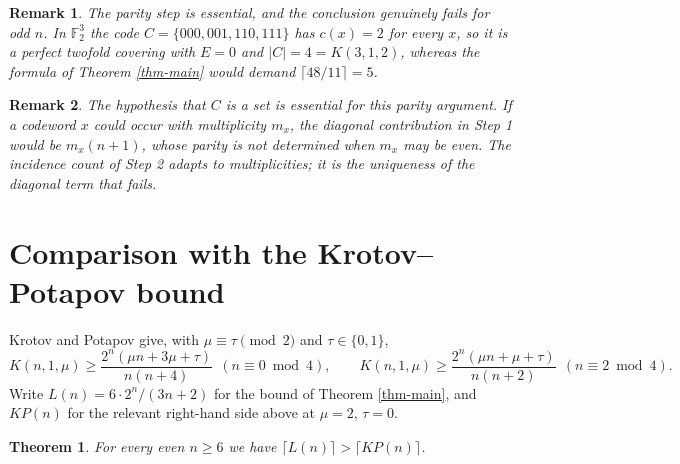 \documentclass[10pt,a4paper]{article}
\newtheorem{theorem}{Theorem}[section]
\newtheorem{remark}{Remark}[section]
\begin{document}
\begin{remark}\label{rem-parity}
The parity step is essential, and the conclusion genuinely fails for odd $n$.
In $\mathbb{F}_2^3$ the code $C=\{000,001,110,111\}$ has $c(x)=2$ for every $x$,
so it is a perfect twofold covering with $E=0$ and $|C|=4=K(3,1,2)$, whereas the
formula of Theorem \ref{thm-main} would demand $\lceil 48/11\rceil=5$.
\end{remark}

\begin{remark}\label{rem-set}
The hypothesis that $C$ is a set is essential for this parity argument. If a
codeword $x$ could occur with multiplicity $m_x$, the diagonal contribution in
Step 1 would be $m_x(n+1)$, whose parity is not determined when $m_x$ may be
even. The incidence count of Step 2 adapts to multiplicities; it is the
uniqueness of the diagonal term that fails.
\end{remark}

\section{Comparison with the Krotov--Potapov bound}\label{sec-dominance}

Krotov and Potapov \cite[Theorem 6]{KP-2021} give, with $\mu\equiv\tau\pmod 2$
and $\tau\in\{0,1\}$,
\[
  K(n,1,\mu)\ge\frac{2^n(\mu n+3\mu+\tau)}{n(n+4)}\ \ (n\equiv 0\bmod 4),
  \qquad
  K(n,1,\mu)\ge\frac{2^n(\mu n+\mu+\tau)}{n(n+2)}\ \ (n\equiv 2\bmod 4).
\]
Write $L(n)=6\cdot 2^n/(3n+2)$ for the bound of Theorem \ref{thm-main}, and
$KP(n)$ for the relevant right-hand side above at $\mu=2$, $\tau=0$.

\begin{theorem}\label{thm-dominance}
For every even $n\ge 6$ we have $\lceil L(n)\rceil > \lceil KP(n)\rceil$.
\end{theorem}
\end{document}
